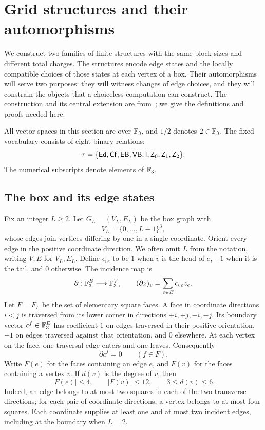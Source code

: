 \section{Grid structures and their automorphisms}\label{str:structures}\label{sec:structures}

We construct two families of finite structures with the same block sizes
and different total charges.  The structures encode edge states and the
locally compatible choices of those states at each vertex of a box.
Their automorphisms will serve two purposes: they will witness changes of
edge choices, and they will constrain the objects that a choiceless
computation can construct.  The construction and its central extension
are from~\cite[Sections~2--3]{cptCompanion2026}; we give the definitions
and proofs needed here.

All vector spaces in this section are over $\mathbb F_3$, and $1/2$ denotes $2\in\mathbb F_3$.
The fixed vocabulary consists of eight binary relations:
\[
 \tau=\{\mathsf{Ed},\mathsf{Cf},\mathsf{EB},\mathsf{VB},\mathsf I,\mathsf Z_0,\mathsf Z_1,\mathsf Z_2\}.
\]
The numerical subscripts denote elements of $\mathbb F_3$.

\subsection{The box and its edge states}

Fix an integer $L\ge2$.  Let $G_L=(V_L,E_L)$ be the box graph with
\[
 V_L=\{0,\ldots,L-1\}^3,
\]
whose edges join vertices differing by one in a single coordinate.
Orient every edge in the positive coordinate direction.  We often omit
$L$ from the notation, writing $V,E$ for $V_L,E_L$.  Define
$\epsilon_{ve}$ to be $1$ when $v$ is the head of $e$, $-1$ when it is the
tail, and $0$ otherwise.  The incidence map is
\[
 \partial:\mathbb F_3^E\longrightarrow\mathbb F_3^V,
 \qquad (\partial z)_v=\sum_{e\in E}\epsilon_{ve}z_e.
\]
Let $F=F_L$ be the set of elementary square faces.  A face in coordinate
directions $i<j$ is traversed from its lower corner in directions
$+i,+j,-i,-j$.  Its boundary vector $c^f\in\mathbb F_3^E$ has coefficient $1$ on
edges traversed in their positive orientation, $-1$ on edges traversed
against that orientation, and $0$ elsewhere.  At each vertex on the face,
one traversal edge enters and one leaves.  Consequently
\begin{equation}\label{str:face-boundary}
 \partial c^f=0\qquad(f\in F).
\end{equation}
Write $F(e)$ for the faces containing an edge $e$, and $F(v)$ for the faces
containing a vertex $v$.  If $d(v)$ is the degree of $v$, then
\begin{equation}\label{str:local-bounds}
 |F(e)|\le4,\qquad |F(v)|\le12,\qquad 3\le d(v)\le6.
\end{equation}
Indeed, an edge belongs to at most two squares in each of the two
transverse directions; for each pair of coordinate directions, a vertex
belongs to at most four squares.  Each coordinate supplies at least one
and at most two incident edges, including at the boundary when $L=2$.

